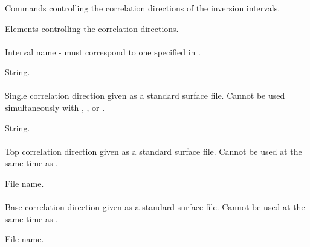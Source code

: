 \subsubsection{}
 \slist
   \item \Description Commands controlling the correlation directions of the inversion intervals.
   \item \Argument Elements controlling the correlation directions.
   \item \Default
 \elist

\paragraph{}
 \slist
   \item \Description Interval name - must correspond to one specified in .
   \item \Argument String.
   \item \Default
 \elist

\paragraph{}
 \slist
   \item \Description Single correlation direction given as a standard surface file. Cannot be used simultaneously with , ,  or .
   \item \Argument String.
   \item \Default
 \elist

\paragraph{}
 \slist
   \item \Description Top correlation direction given as a standard surface file. Cannot be used at the same time as .
   \item \Argument File name.
   \item \Default
 \elist

\paragraph{}
 \slist
   \item \Description Base correlation direction given as a standard surface file. Cannot be used at the same time as .
   \item \Argument File name.
   \item \Default
 \elist

